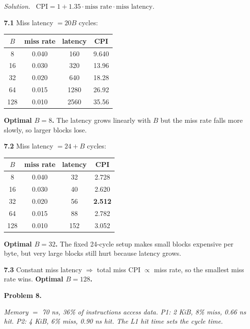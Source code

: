 \documentclass[12pt]{article}
\newcommand{\problem}[1]{\vspace{0.8em}\noindent\textbf{Problem #1.}\vspace{0.35em}}
\newenvironment{solution}{\par\noindent\textit{Solution.}\ }{\par\vspace{1.1em}}
\newcommand{\subproblem}[1]{\par\vspace{0.45em}\noindent\textbf{#1}\quad}
\newcommand{\assigntext}[1]{\par\vspace{0.25em}\small\textit{#1}\par\vspace{0.35em}}
\begin{document}
\begin{solution}
$\text{CPI} = 1 + 1.35 \cdot \text{miss rate} \cdot \text{miss latency}$.

\subproblem{7.1} Miss latency $= 20B$ cycles:
\begin{center}\small
\begin{tabular}{@{}cccc@{}}\toprule
$B$ & miss rate & latency & CPI \\\midrule
8   & 0.040 & 160  & 9.640 \\
16  & 0.030 & 320  & 13.96 \\
32  & 0.020 & 640  & 18.28 \\
64  & 0.015 & 1280 & 26.92 \\
128 & 0.010 & 2560 & 35.56 \\
\bottomrule\end{tabular}\end{center}
\textbf{Optimal $B = 8$.} The latency grows linearly with $B$ but the miss rate falls more slowly, so larger blocks lose.

\subproblem{7.2} Miss latency $= 24 + B$ cycles:
\begin{center}\small
\begin{tabular}{@{}cccc@{}}\toprule
$B$ & miss rate & latency & CPI \\\midrule
8   & 0.040 & 32  & 2.728 \\
16  & 0.030 & 40  & 2.620 \\
32  & 0.020 & 56  & \textbf{2.512} \\
64  & 0.015 & 88  & 2.782 \\
128 & 0.010 & 152 & 3.052 \\
\bottomrule\end{tabular}\end{center}
\textbf{Optimal $B = 32$.} The fixed 24-cycle setup makes small blocks expensive per byte, but very large blocks still hurt because latency grows.

\subproblem{7.3} Constant miss latency $\Rightarrow$ total miss CPI $\propto$ miss rate, so the smallest miss rate wins. \textbf{Optimal $B = 128$.}
\end{solution}

\problem{8}
\assigntext{Memory $=$ 70 ns, 36\% of instructions access data. P1: 2 KiB, 8\% miss, 0.66 ns hit. P2: 4 KiB, 6\% miss, 0.90 ns hit. The L1 hit time sets the cycle time.}
\end{document}
